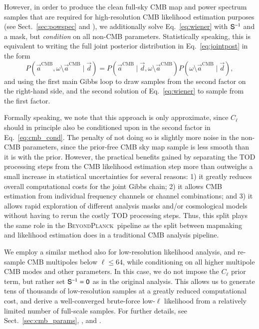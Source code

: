 \documentclass[twocolumn]{aa}
\renewcommand{\d}[0]{\vec{d}}
\renewcommand{\a}[0]{\vec{a}}
\renewcommand{\S}[0]{\tens{S}}
\newcommand{\BP}{\textsc{BeyondPlanck}}
\begin{document}
However, in order to produce the clean full-sky CMB map and power
spectrum samples that are required for high-resolution CMB likelihood
estimation purposes (see Sect.~\ref{sec:powspec} and \citealp{bp11}),
we additionally solve Eq.~\eqref{eq:wiener} with $\S^{-1}$ and a mask,
but \emph{condition} on all non-CMB parameters. Statistically
speaking, this is equivalent to writing the full joint posterior
distribution in Eq.~\eqref{eq:jointpost} in the form
\begin{equation}
  P(\a^\mathrm{CMB}, \omega\setminus\a^{\mathrm{CMB}}\mid \d) =
  P(\a^\mathrm{CMB}\mid \d, \omega\setminus\a^{\mathrm{CMB}})
  P(\omega\setminus\a^{\mathrm{CMB}}\mid \d),
  \label{eq:cmb_cond}
\end{equation}
and using the first main Gibbs loop to draw samples from the second
factor on the right-hand side, and the second solution of
Eq.~\eqref{eq:wiener} to sample from the first factor.

Formally speaking, we note that this approach is only approximate,
since $C_{\ell}$ should in principle also be conditioned upon in the
second factor in Eq.~\eqref{eq:cmb_cond}. The penalty of not doing so
is slightly more noise in the non-CMB parameters, since the prior-free
CMB sky map sample is less smooth than it is with the prior. However,
the practical benefits gained by separating the TOD processing steps
from the CMB likelihood estimation step more than outweighs a small
increase in statistical uncertainties for several reasons: 1) it
greatly reduces overall computational costs for the joint Gibbs chain;
2) it allows CMB estimation from individual frequency channels or
channel combinations; and 3) it allows rapid exploration of different
analysis masks and/or cosmological models without having to rerun the
costly TOD processing steps. Thus, this split plays the same role in
the \BP\ pipeline as the split between mapmaking and likelihood
estimation does in a traditional CMB analysis pipeline.

We employ a similar method also for low-resolution likelihood analysis,
and re-sample CMB multipoles below $\ell\le64$, while conditioning on
all higher multipole CMB modes and other parameters. In this case, we
do not impose the $C_{\ell}$ prior term, but rather set $\S^{-1}=\tens 0$ as
in the original analysis. This allows us to generate tens of thousands
of low-resolution samples at a greatly reduced computational cost, and
derive a well-converged brute-force low-$\ell$ likelihood from a
relatively limited number of full-scale samples. For further details,
see Sect.~\ref{sec:cmb_params}, \citet{bp11}, and \citet{bp12}.
\end{document}
